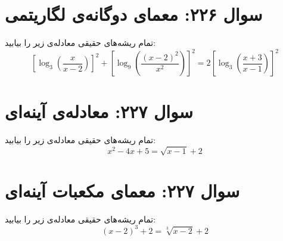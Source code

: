 \documentclass[12pt]{article}
\begin{document}
\section*{سوال ۲۲۶: معمای دوگانه‌ی لگاریتمی}
تمام ریشه‌های حقیقی معادله‌ی زیر را بیابید:
\begin{displaymath}
	\left[\log_3\left(\frac{x}{x-2}\right)\right]^2 + \left[\log_9\left(\frac{(x-2)^2}{x^2}\right)\right]^2 = 2\left[\log_3\left(\frac{x+3}{x-1}\right)\right]^2
\end{displaymath}

\vspace{1cm}
\hrulefill
\vspace{1cm}


\section*{سوال ۲۲۷: معادله‌ی آینه‌ای}
تمام ریشه‌های حقیقی معادله‌ی زیر را بیابید:
\begin{displaymath}
	x^2 - 4x + 5 = \sqrt{x-1} + 2
\end{displaymath}

\vspace{1cm}
\hrulefill
\vspace{1cm}

\section*{سوال ۲۲۷: معمای مکعبات آینه‌ای}
تمام ریشه‌های حقیقی معادله‌ی زیر را بیابید:
\begin{displaymath}
	(x-2)^3 + 2 = \sqrt[3]{x-2} + 2
\end{displaymath}
\end{document}
